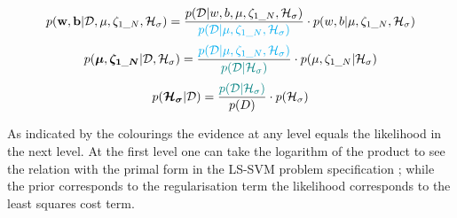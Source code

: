 \begin{equation}
p(\textbf{w},\textbf{b}|\mathcal{D},\mu,\zeta_{1\_N},\mathcal{H}_{\sigma}) = \frac{p(\mathcal{D}|w,b,\mu,\zeta_{1\_N},\mathcal{H}_{\sigma})}{\textcolor{cyan}{p(\mathcal{D}|\mu,\zeta_{1\_N},\mathcal{H}_{\sigma})}}\cdot p(w,b|\mu,\zeta_{1\_N},\mathcal{H}_{\sigma})
\end{equation}
\begin{equation}
p(\boldsymbol{\mu},\boldsymbol{\zeta_{1\_N}}|\mathcal{D},\mathcal{H}_{\sigma})=\frac{\textcolor{cyan}{p(\mathcal{D}|\mu,\zeta_{1\_N},\mathcal{H}_{\sigma})}}{\textcolor{teal}{p(\mathcal{D}|\mathcal{H}_{\sigma})}}\cdot p(\mu,\zeta_{1\_N}|\mathcal{H}_{\sigma})
\end{equation}
\begin{equation}
p(\boldsymbol{\mathcal{H}_{\sigma}}|\mathcal{D})=\frac{\textcolor{teal}{p(\mathcal{D}|\mathcal{H}_{\sigma})}}{p(D)}\cdot p(\mathcal{H}_{\sigma})
\end{equation}

As indicated by the colourings the evidence at any level equals the likelihood in the next level. At the first level one can take the logarithm of the product to see the relation with the primal form in the LS-SVM problem specification ; while the prior corresponds to the regularisation term the likelihood corresponds to the least squares cost term.

